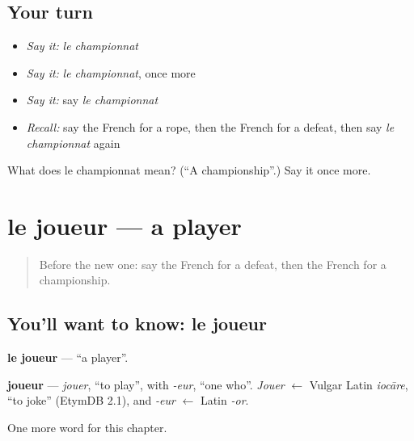 \subsection*{Your turn}
\begin{itemize}
\raggedright
  \item \emph{Say it:} \emph{le championnat}
  \item \emph{Say it:} \emph{le championnat}, once more
  \item \emph{Say it:} say \emph{le championnat}
  \item \emph{Recall:} say the French for a rope, then the French for a defeat, then say \emph{le championnat} again
\end{itemize}

\begin{tcolorbox}[breakable,colback=teal!4,colframe=teal!35!black,title={Before you move on}]
What does le championnat mean? (\textquotedblleft{}A championship\textquotedblright{}.) Say it once more.
\end{tcolorbox}
\section[le joueur]{le joueur — a player}

\label{lesson:FR-C203-joueur}



\begin{quote}
Before the new one: say the French for a defeat, then the French for a championship.
\end{quote}

\subsection*{You'll want to know: le joueur}
\textbf{le joueur} — \textquotedblleft{}a player\textquotedblright{}.

\begin{cousinweb}
\textbf{joueur} — \emph{jouer}, \textquotedblleft{}to play\textquotedblright{}, with \emph{-eur}, \textquotedblleft{}one who\textquotedblright{}. \emph{Jouer} $\leftarrow$ Vulgar Latin \emph{iocāre}, \textquotedblleft{}to joke\textquotedblright{} (EtymDB 2.1), and \emph{-eur} $\leftarrow$ Latin \emph{-or}.
\end{cousinweb}

\begin{grammarlens}[title={What you've built}]
One more word for this chapter.
\end{grammarlens}

